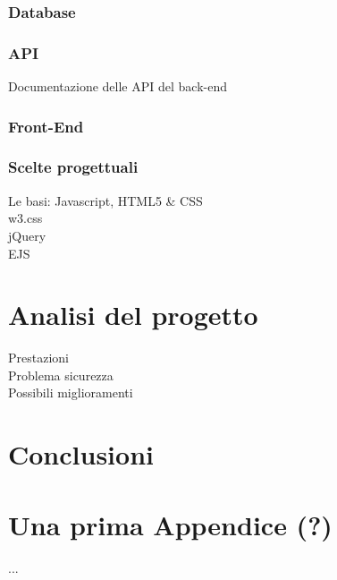 \documentclass[12pt]{report}
\begin{document}
\subsection*{Database}
%
\subsection*{API}
Documentazione delle API del back-end
%
\subsection{Front-End}
\subsection*{Scelte progettuali}
Le basi: Javascript, HTML5 \& CSS
\\
w3.css
\\
jQuery
\\
EJS
\\
%
% 
\chapter{Analisi del progetto}
\label{cap4}
Prestazioni
\\
Problema sicurezza
\\
Possibili miglioramenti
\\
%
% 
\chapter{Conclusioni}


\label{cap5}
%
%

\appendix
\chapter{Una prima Appendice (?)}
...
\end{document}
